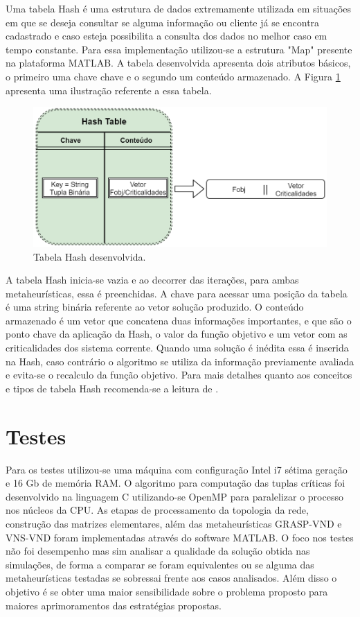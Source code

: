 \documentclass[12pt]{article}
\begin{document}
Uma tabela Hash é uma estrutura de dados extremamente utilizada em situações em que se deseja consultar se alguma informação ou cliente já se encontra cadastrado e caso esteja possibilita a consulta dos dados no melhor caso em tempo constante. Para essa implementação utilizou-se a estrutura "Map" presente na plataforma MATLAB\textregistered. A tabela desenvolvida apresenta dois atributos básicos, o primeiro uma chave chave e o segundo  um conteúdo armazenado. A Figura \ref{fig11} apresenta uma ilustração referente a essa tabela.

\begin{figure}[H]
	\centering 
	\includegraphics[scale=0.7]{figuras/Hash_table.jpg}
	\caption{Tabela Hash desenvolvida.}
	\label{fig11} %
\end{figure}

A tabela Hash inicia-se vazia e ao decorrer das iterações, para ambas metaheurísticas, essa é preenchidas. A chave para acessar uma posição da tabela é uma string binária referente ao vetor solução produzido. O conteúdo armazenado é um vetor que concatena duas informações importantes, e que são o ponto chave da aplicação da Hash, o valor da função objetivo e um vetor com as criticalidades dos sistema corrente. Quando uma solução é inédita essa é inserida na Hash, caso contrário o algoritmo se utiliza da informação previamente avaliada e evita-se o recalculo da função objetivo. Para mais detalhes quanto aos conceitos e tipos de tabela Hash recomenda-se a leitura de \cite{Cormen}.

\section{Testes}

Para os testes utilizou-se uma máquina com configuração Intel i7 sétima geração e 16 Gb de memória RAM. O algoritmo para computação das tuplas críticas foi desenvolvido na linguagem C utilizando-se OpenMP para paralelizar o processo nos núcleos da CPU. As etapas de processamento da topologia da rede, construção das matrizes elementares, além das metaheurísticas GRASP-VND e VNS-VND foram implementadas através do software MATLAB\textregistered. O foco nos testes não foi desempenho mas sim analisar a qualidade da solução obtida nas simulações, de forma a comparar se foram equivalentes ou se alguma das metaheurísticas testadas se sobressai frente aos casos analisados. Além disso o objetivo é se obter uma maior sensibilidade sobre o problema proposto para maiores aprimoramentos das estratégias propostas.
\end{document}
